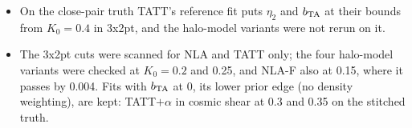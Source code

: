 \documentclass[11pt]{article}
\begin{document}
\begin{itemize}
    the stitched and E minus B truths and the earlier split; the recommended
    cuts hold on all three.
  \item On the close-pair truth TATT's reference fit puts $\eta_2$ and
    $b_{\rm TA}$ at their bounds from $K_0 = 0.4$ in 3x2pt, and the
    halo-model variants were not rerun on it.
  \item The 3x2pt cuts were scanned for NLA and TATT only; the four
    halo-model variants were checked at $K_0 = 0.2$ and 0.25, and NLA-F also
    at 0.15, where it passes by 0.004. Fits with $b_{\rm TA}$ at 0, its lower
    prior edge (no density weighting), are kept: TATT$+\alpha$ in cosmic
    shear at 0.3 and 0.35 on the stitched truth.
\end{itemize}
\end{document}
